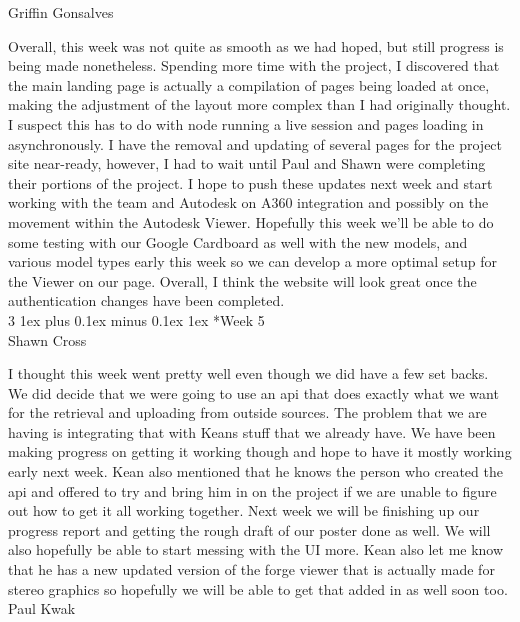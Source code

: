 \documentclass[letterpaper, 10pt, draftclsnofoot, compsoc, onecolumn]{IEEEtran}
\makeatletter
\def\subsubsection{\@startsection{subsubsection}%
                                 {3}%
                                 {\z@}%
                                 {1ex plus 0.1ex minus 0.1ex}%
                                 {1ex}%
                                 {\normalfont\normalsize}}%
\makeatother
\begin{document}
Griffin Gonsalves

Overall, this week was not quite as smooth as we had hoped, but still progress is being made nonetheless. Spending more time with the project, I discovered that the main landing page is actually a compilation of pages being loaded at once, making the adjustment of the layout more complex than I had originally thought. I suspect this has to do with node running a live session and pages loading in asynchronously. I have the removal and updating of several pages for the project site near-ready, however, I had to wait until Paul and Shawn were completing their portions of the project. I hope to push these updates next week and start working with the team and Autodesk on A360 integration and possibly on the movement within the Autodesk Viewer. Hopefully this week we'll be able to do some testing with our Google Cardboard as well with the new models, and various model types early this week so we can develop a more optimal setup for the Viewer on our page. Overall, I think the website will look great once the authentication changes have been completed.\\

\subsubsection*{Week 5}\hspace*{\fill} \\
Shawn Cross

I thought this week went pretty well even though we did have a few set backs. We did decide that we were going to use an api that does exactly what we want for the retrieval and uploading from outside sources. The problem that we are having is integrating that with Keans stuff that we already have. We have been making progress on getting it working though and hope to have it mostly working early next week. Kean also mentioned that he knows the person who created the api and offered to try and bring him in on the project if we are unable to figure out how to get it all working together. Next week we will be finishing up our progress report and getting the rough draft of our poster done as well. We will also hopefully be able to start messing with the UI more. Kean also let me know that he has a new updated version of the forge viewer that is actually made for stereo graphics so hopefully we will be able to get that added in as well soon too.\\

Paul Kwak
\end{document}
